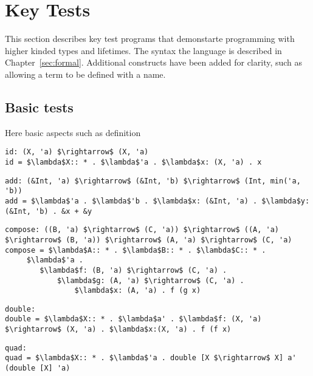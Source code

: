 \chapter{Key Tests}\label{sec:testing}

This section describes key test programs that demonstarte programming
with higher kinded types and lifetimes. The syntax the language is described
in Chapter~\ref{sec:formal}. Additional constructs have been added for clarity,
such as allowing a term to be defined with a name.

\section{Basic tests}
Here basic aspects such as definition

\begin{lstlisting}[mathescape, caption={Identity function}, label={lst:id}]
id: (X, 'a) $\rightarrow$ (X, 'a)
id = $\lambda$X:: * . $\lambda$'a . $\lambda$x: (X, 'a) . x
\end{lstlisting}

\begin{lstlisting}[mathescape, caption={Addition of two references}, label={lst:add}]
add: (&Int, 'a) $\rightarrow$ (&Int, 'b) $\rightarrow$ (Int, min('a, 'b))
add = $\lambda$'a . $\lambda$'b . $\lambda$x: (&Int, 'a) . $\lambda$y: (&Int, 'b) . &x + &y
\end{lstlisting}

\begin{lstlisting}[mathescape, caption={Function composition}, label={lst:compose}]
compose: ((B, 'a) $\rightarrow$ (C, 'a)) $\rightarrow$ ((A, 'a) $\rightarrow$ (B, 'a)) $\rightarrow$ (A, 'a) $\rightarrow$ (C, 'a)
compose = $\lambda$A:: * . $\lambda$B:: * . $\lambda$C:: * .
     $\lambda$'a .
        $\lambda$f: (B, 'a) $\rightarrow$ (C, 'a) .
            $\lambda$g: (A, 'a) $\rightarrow$ (C, 'a) .
                $\lambda$x: (A, 'a) . f (g x)
\end{lstlisting}

\begin{lstlisting}[mathescape, caption={Double Function application}, label={lst:double}]
double: 
double = $\lambda$X:: * . $\lambda$a' . $\lambda$f: (X, 'a) $\rightarrow$ (X, 'a) . $\lambda$x:(X, 'a) . f (f x)
\end{lstlisting}

\begin{lstlisting}[mathescape, caption={Quadruple application function using double}, label={lst:quad}]
quad: 
quad = $\lambda$X:: * . $\lambda$'a . double [X $\rightarrow$ X] a' (double [X] 'a)
\end{lstlisting}
